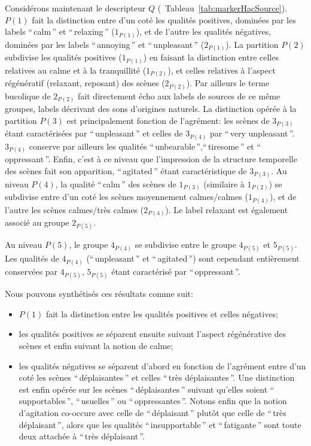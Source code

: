 Considérons maintenant le descripteur $Q$ (\cf~Tableau~\ref{tab:markerHacSource}). $P(1)$ fait la distinction entre d'un coté les qualités positives, dominées par les labels ``\,calm\,'' et ``\,relaxing\,'' ($1_{P(1)}$), et de l'autre les qualités négatives, dominées par les labels ``\,annoying\,'' et ``\,unpleasant\,'' ($2_{P(1)}$). La partition $P(2)$ subdivise les qualités positives ($1_{P(1)}$) en faisant la distinction entre celles relatives au calme et à la tranquillité ($1_{P(2)}$), et celles relatives à l'aspect régénératif (relaxant, reposant) des scènes ($2_{P(2)}$). Par ailleurs le terme bucolique de $2_{P(2)}$ fait directement écho aux labels de sources de ce même groupes, labels décrivant des sons d'origines naturels.  La distinction opérée à la partition $P(3)$ est principalement fonction de l'agrément: les scènes de $3_{P(3)}$ étant caractérisées par ``\,unpleasant\,'' et celles de  $3_{P(4)}$ par ``\,very unpleasant\,''.  $3_{P(4)}$ conserve par ailleurs les qualités  ``\,unbearable\,'',``\,tiresome\,'' et ``\,oppressant\,''. Enfin, c'est à ce niveau que l'impression de la structure temporelle des scènes fait son apparition,  ``\,agitated\,'' étant caractéristique de $3_{P(3)}$. Au niveau $P(4)$, la qualité ``\,calm\,'' des scènes de $1_{P(3)}$ (similaire à $1_{P(2)}$) se subdivise entre d'un coté les scènes moyennement calmes/calmes ($1_{P(4)}$), et de l'autre les scènes calmes/très calmes ($2_{P(4)}$). Le label relaxant est également associé au groupe $2_{P(5)}$.

Au niveau $P(5)$, le groupe $4_{P(4)}$ se subdivise entre le groupe $4_{P(5)}$ et $5_{P(5)}$. Les qualités de $4_{P(4)}$  (``\,unpleasant\,'' et ``\,agitated\,'') sont cependant entièrement conservées par $4_{P(5)}$,  $5_{P(5)}$ étant caractérisé par ``\,oppressant\,''.

Nous pouvons synthétisés ces résultats comme suit:

\begin{itemize}
\item $P(1)$ fait la distinction entre les qualités positives et celles négatives;
\item les qualités positives se séparent ensuite suivant l'aspect régénérative des scènes et enfin suivant la notion de calme;
\item les qualités négatives se séparent d'abord  en fonction de l'agrément entre d'un coté les scènes ``\,déplaisantes\,'' et celles ``\,très déplaisantes\,''. Une distinction est enfin opérée sur les scènes ``\,déplaisantes\,'' suivant qu'elles soient ``\,supportables\,'', ``\,usuelles\,'' ou ``\,oppressantes\,''. Notons enfin que la notion d'agitation co-occure avec celle de ``\,déplaisant\,'' plutôt que celle de ``\,très déplaisant\,'', alors que les qualités ``\,insupportable\,'' et ``\,fatigante\,'' sont toute deux attachée à ``\,très déplaisant\,''.
\end{itemize}

